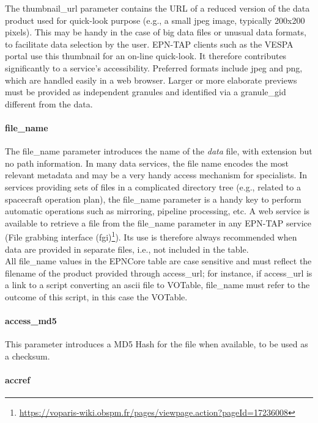 \documentclass[11pt,a4paper]{ivoa}
\begin{document}
The thumbnail\_url parameter contains the URL of a reduced version
of the data product used for quick-look purpose (e.g., a small jpeg
image, typically 200x200 pixels). This may be handy in the case of big
data files or unusual data formats, to facilitate data selection by the
user. EPN-TAP clients such as the VESPA portal use this thumbnail for
an on-line quick-look.  It therefore contributes significantly to a
service's accessibility.
Preferred formats include jpeg and png, which are handled easily
in a web browser. Larger or more elaborate previews must be provided as
independent granules and identified via a granule\_gid different from
the data.

\paragraph{file\_name}

The file\_name parameter introduces the name of the \emph{data}
file, with extension but no path information. In many data services,
the file name encodes the most relevant metadata and may be a
very handy access mechanism for specialists. In services providing
sets of files in a complicated directory tree (e.g., related to
a spacecraft operation plan), the file\_name parameter is a handy
key to perform automatic operations such as mirroring, pipeline
processing, etc.  A web service is available to retrieve a file from
the file\_name parameter in any EPN-TAP service (File grabbing interface
(fgi)\footnote{\url{https://voparis-wiki.obspm.fr/pages/viewpage.action?pageId=17236008}}).
Its use is therefore always recommended when data are provided in separate
files, i.e., not included in the table.\\
All file\_name values in the
EPNCore table are case sensitive and must reflect the filename of the
product provided through access\_url; for instance, if access\_url is
a link to a script converting an ascii file to VOTable, file\_name must
refer to the outcome of this script, in this case the VOTable.

\paragraph{access\_md5}

This parameter introduces a MD5 Hash for the file when available, to be used as a checksum.

\paragraph{accref}
\end{document}

